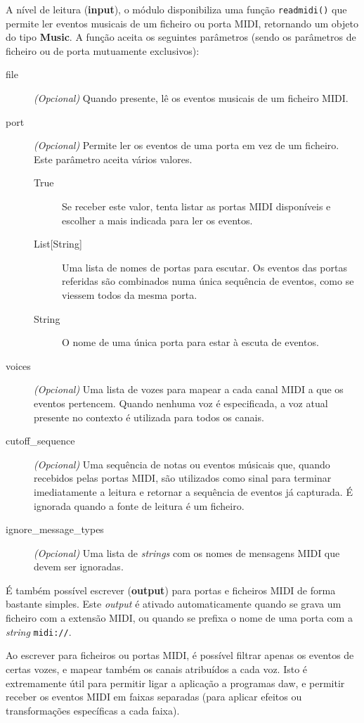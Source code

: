 A nível de leitura (\textbf{input}), o módulo disponibiliza uma função \texttt{readmidi()} que permite ler eventos musicais de um ficheiro ou porta MIDI, retornando um objeto do tipo \textbf{Music}. A função aceita os seguintes parâmetros (sendo os parâmetros de ficheiro ou de porta mutuamente exclusivos):

\begin{description}
 \item[file] \textit{(Opcional)} Quando presente, lê os eventos musicais de um ficheiro MIDI.
 \item[port] \textit{(Opcional)} Permite ler os eventos de uma porta em vez de um ficheiro. Este parâmetro aceita vários valores.
 \begin{description}
  \item[True] Se receber este valor, tenta listar as portas MIDI disponíveis e escolher a mais indicada para ler os eventos.
  \item[List{[String]}] Uma lista de nomes de portas para escutar. Os eventos das portas referidas são combinados numa única sequência de eventos, como se viessem todos da mesma porta.
  \item[String] O nome de uma única porta para estar à escuta de eventos.
 \end{description}
 \item[voices] \textit{(Opcional)} Uma lista de vozes para mapear a cada canal MIDI a que os eventos pertencem. Quando nenhuma voz é especificada, a voz atual presente no contexto é utilizada para todos os canais.
 \item[cutoff\_sequence] \textit{(Opcional)} Uma sequência de notas ou eventos músicais que, quando recebidos pelas portas MIDI, são utilizados como sinal para terminar imediatamente a leitura e retornar a sequência de eventos já capturada. É ignorada quando a fonte de leitura é um ficheiro.
 \item[ignore\_message\_types] \textit{(Opcional)} Uma lista de \textit{strings} com os nomes de mensagens MIDI que devem ser ignoradas.
\end{description}

É também possível escrever (\textbf{output}) para portas e ficheiros MIDI de forma bastante simples. Este \textit{output} é ativado automaticamente quando se grava um ficheiro com a extensão MIDI, ou quando se prefixa o nome de uma porta com a \textit{string} \texttt{midi://}.

Ao escrever para ficheiros ou portas MIDI, é possível filtrar apenas os eventos de certas vozes, e mapear também os canais atribuídos a cada voz. Isto é extremamente útil para permitir ligar a aplicação a programas \acrshort{daw}, e permitir receber os eventos MIDI em faixas separadas (para aplicar efeitos ou transformações específicas a cada faixa).

